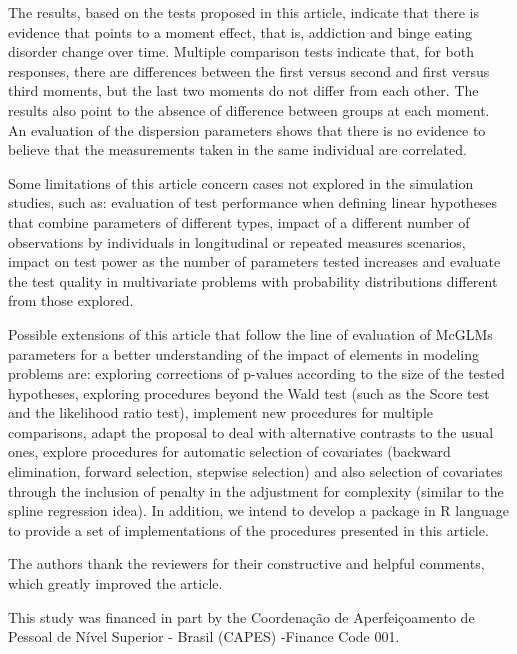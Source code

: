 \documentclass[USenglish]{article}
\theoremstyle{dgthm}
\theoremstyle{dgdef}
\begin{document}
The results, based on the tests proposed in this article, indicate that there is evidence that points to a moment effect, that is, addiction and binge eating disorder change over time. 
Multiple comparison tests indicate that, for both responses, there are differences between the first versus second and first versus third moments, but the last two moments do not differ from each other. 
The results also point to the absence of difference between groups at each moment. An evaluation of the dispersion parameters shows that there is no evidence to believe that the measurements taken in the same individual are correlated.

Some limitations of this article concern cases not explored in the simulation studies, such as: evaluation of test performance when defining linear hypotheses that combine parameters of different types, impact of a different number of observations by individuals in longitudinal or repeated measures scenarios, impact on test power as the number of parameters tested increases and evaluate the test quality in multivariate problems with probability distributions different from those explored.

Possible extensions of this article that follow the line of evaluation of McGLMs parameters for a better understanding of the impact of elements in modeling problems are: exploring corrections of p-values according to the size of the tested hypotheses, exploring procedures beyond the Wald test (such as the Score test and the likelihood ratio test), implement new procedures for multiple comparisons, adapt the proposal to deal with alternative contrasts to the usual ones, explore procedures for automatic selection of covariates (backward elimination, forward selection, stepwise selection) and also selection of covariates through the inclusion of penalty in the adjustment for complexity (similar to the spline regression idea). In addition, we intend to develop a package in R language to provide a set of implementations of the procedures presented in this article.



\begin{acknowledgement}
The authors thank the reviewers for their constructive and helpful comments, which greatly improved the article.
\end{acknowledgement}

\begin{funding}
This study was financed in part by the Coordenação de Aperfeiçoamento de Pessoal de Nível Superior - Brasil (CAPES) -Finance Code 001.
\end{funding}
\end{document}
